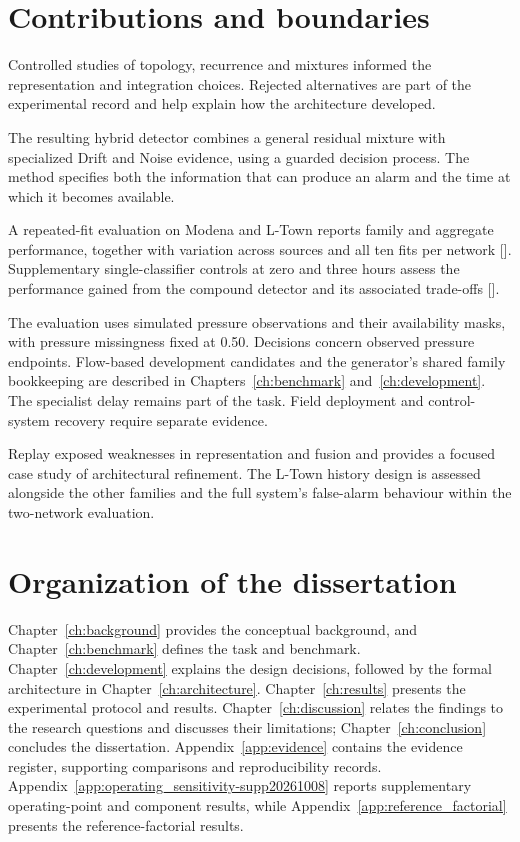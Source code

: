 \section{Contributions and boundaries}
Controlled studies of topology, recurrence and mixtures informed the representation and integration choices. Rejected alternatives are part of the experimental record and help explain how the architecture developed.

The resulting hybrid detector combines a general residual mixture with specialized Drift and Noise evidence, using a guarded decision process. The method specifies both the information that can produce an alarm and the time at which it becomes available.

A repeated-fit evaluation on Modena and L-Town reports family and aggregate performance, together with variation across sources and all ten fits per network []. Supplementary single-classifier controls at zero and three hours assess the performance gained from the compound detector and its associated trade-offs [].

The evaluation uses simulated pressure observations and their availability masks, with pressure missingness fixed at 0.50. Decisions concern observed pressure endpoints. Flow-based development candidates and the generator's shared family bookkeeping are described in Chapters~\ref{ch:benchmark} and~\ref{ch:development}. The specialist delay remains part of the task. Field deployment and control-system recovery require separate evidence.

Replay exposed weaknesses in representation and fusion and provides a focused case study of architectural refinement. The L-Town history design is assessed alongside the other families and the full system's false-alarm behaviour within the two-network evaluation.

\section{Organization of the dissertation}
Chapter~\ref{ch:background} provides the conceptual background, and Chapter~\ref{ch:benchmark} defines the task and benchmark. Chapter~\ref{ch:development} explains the design decisions, followed by the formal architecture in Chapter~\ref{ch:architecture}. Chapter~\ref{ch:results} presents the experimental protocol and results. Chapter~\ref{ch:discussion} relates the findings to the research questions and discusses their limitations; Chapter~\ref{ch:conclusion} concludes the dissertation. Appendix~\ref{app:evidence} contains the evidence register, supporting comparisons and reproducibility records. Appendix~\ref{app:operating_sensitivity-supp20261008} reports supplementary operating-point and component results, while Appendix~\ref{app:reference_factorial} presents the reference-factorial results.
